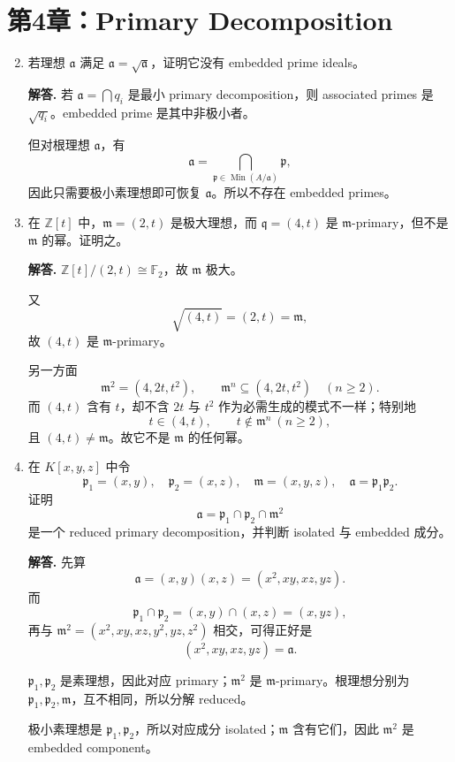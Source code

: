 \documentclass[a4paper]{ctexart}
\begin{document}
\section{第4章：Primary Decomposition}

\begin{enumerate}[leftmargin=*, label=\textbf{4.\arabic*.}]
\setcounter{enumi}{1}
\item 若理想 \(\mathfrak a\) 满足 \(\mathfrak a=\sqrt{\mathfrak a}\)，证明它没有 embedded prime ideals。

\textbf{解答.}
若 \(\mathfrak a=\bigcap q_i\) 是最小 primary decomposition，则 associated primes 是 \(\sqrt{q_i}\)。embedded prime 是其中非极小者。

但对根理想 \(\mathfrak a\)，有
\[
\mathfrak a=\bigcap_{\mathfrak p\in \operatorname{Min}(A/\mathfrak a)} \mathfrak p,
\]
因此只需要极小素理想即可恢复 \(\mathfrak a\)。所以不存在 embedded primes。

\setcounter{enumi}{3}
\item 在 \(\mathbb Z[t]\) 中，\(\mathfrak m=(2,t)\) 是极大理想，而 \(\mathfrak q=(4,t)\) 是 \(\mathfrak m\)-primary，但不是 \(\mathfrak m\) 的幂。证明之。

\textbf{解答.}
\(\mathbb Z[t]/(2,t)\cong \mathbb F_2\)，故 \(\mathfrak m\) 极大。

又
\[
\sqrt{(4,t)}=(2,t)=\mathfrak m,
\]
故 \((4,t)\) 是 \(\mathfrak m\)-primary。

另一方面
\[
\mathfrak m^2=(4,2t,t^2),\qquad \mathfrak m^n\subseteq (4,2t,t^2)\quad (n\ge 2).
\]
而 \((4,t)\) 含有 \(t\)，却不含 \(2t\) 与 \(t^2\) 作为必需生成的模式不一样；特别地
\[
t\in (4,t),\qquad t\notin \mathfrak m^n\ (n\ge 2),
\]
且 \((4,t)\ne \mathfrak m\)。故它不是 \(\mathfrak m\) 的任何幂。

\setcounter{enumi}{4}
\item 在 \(K[x,y,z]\) 中令
\[
\mathfrak p_1=(x,y),\quad \mathfrak p_2=(x,z),\quad \mathfrak m=(x,y,z),\quad \mathfrak a=\mathfrak p_1\mathfrak p_2.
\]
证明
\[
\mathfrak a=\mathfrak p_1\cap \mathfrak p_2\cap \mathfrak m^2
\]
是一个 reduced primary decomposition，并判断 isolated 与 embedded 成分。

\textbf{解答.}
先算
\[
\mathfrak a=(x,y)(x,z)=(x^2,x y,x z,y z).
\]
而
\[
\mathfrak p_1\cap \mathfrak p_2=(x,y)\cap(x,z)=(x,yz),
\]
再与 \(\mathfrak m^2=(x^2,xy,xz,y^2,yz,z^2)\) 相交，可得正好是
\[
(x^2,xy,xz,yz)=\mathfrak a.
\]

\(\mathfrak p_1,\mathfrak p_2\) 是素理想，因此对应 primary；\(\mathfrak m^2\) 是 \(\mathfrak m\)-primary。根理想分别为 \(\mathfrak p_1,\mathfrak p_2,\mathfrak m\)，互不相同，所以分解 reduced。

极小素理想是 \(\mathfrak p_1,\mathfrak p_2\)，所以对应成分 isolated；\(\mathfrak m\) 含有它们，因此 \(\mathfrak m^2\) 是 embedded component。
\end{enumerate}
\end{document}
